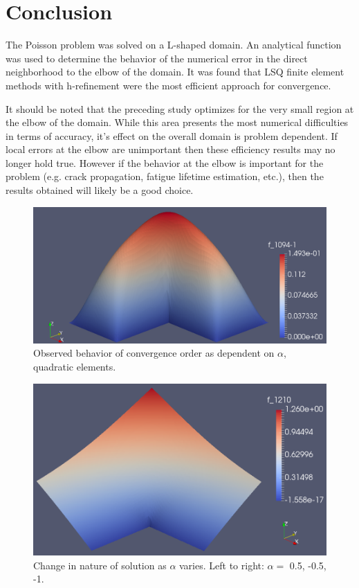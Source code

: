 \documentclass[letterpaper,10pt]{article}
\begin{document}
\newpage

\section*{Conclusion}
The Poisson problem was solved on a L-shaped domain. An analytical function was used to determine the behavior of the numerical error in the direct neighborhood to the elbow of the domain. It was found that LSQ finite element methods with h-refinement were the most efficient approach for convergence.

It should be noted that the preceding study optimizes for the very small region at the elbow of the domain. While this area presents the most numerical difficulties in terms of accuracy, it's effect on the overall domain is problem dependent. If local errors at the elbow are unimportant then these efficiency results may no longer hold true. However if the behavior at the elbow is important for the problem (e.g. crack propagation, fatigue lifetime estimation, etc.), then the results obtained will likely be a good choice.

\newpage

\begin{figure}[!htb]
\centering
\includegraphics[width=1 \linewidth]{sol.PNG}
\caption{Observed behavior of convergence order as dependent on $\alpha$, quadratic elements.}
\end{figure}

\begin{figure}[!htb]
\centering
\includegraphics[width=1 \linewidth]{f.PNG}
\caption{Change in nature of solution as $\alpha$ varies. Left to right: $\alpha =$ 0.5, -0.5, -1.}
\end{figure}
\end{document}
